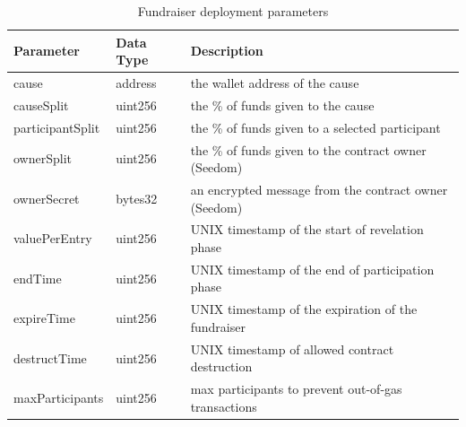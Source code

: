 \documentclass[11pt]{article}
\begin{document}
\begin{table}[H]
\begin{center}
\begin{tabular}{| l | l | l |}
\hline
\textbf{Parameter} & \textbf{Data Type} & \textbf{Description} \\ \hline
cause & address & the wallet address of the cause \\ \hline
causeSplit & uint256 & the \% of funds given to the cause \\ \hline
participantSplit & uint256 & the \% of funds given to a selected participant \\ \hline
ownerSplit & uint256 & the \% of funds given to the contract owner (Seedom) \\ \hline
ownerSecret & bytes32 & an encrypted message from the contract owner (Seedom) \\ \hline
valuePerEntry & uint256 & UNIX timestamp of the start of revelation phase \\ \hline
endTime & uint256 & UNIX timestamp of the end of participation phase \\ \hline
expireTime & uint256 & UNIX timestamp of the expiration of the fundraiser \\ \hline
destructTime & uint256 & UNIX timestamp of allowed contract destruction \\ \hline
maxParticipants & uint256 & max participants to prevent out-of-gas transactions \\ \hline
\end{tabular}
\caption{Fundraiser deployment parameters}
\label{tab:fundraiserDeploymentParameters}
\end{center}
\end{table}
\end{document}
